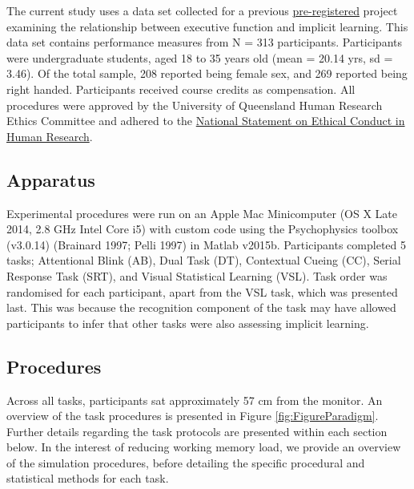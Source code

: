 \documentclass{article}
\begin{document}
\label{sec:Participants}

The current study uses a data set collected for a previous
\href{https://osf.io/nxysg}{pre-registered} project examining the
relationship between executive function and implicit learning. This data
set contains performance measures from N = 313 participants.
Participants were undergraduate students, aged 18 to 35 years old (mean
= 20.14 yrs, sd = 3.46). Of the total sample, 208 reported being female
sex, and 269 reported being right handed. Participants received course
credits as compensation. All procedures were approved by the University
of Queensland Human Research Ethics Committee and adhered to the
\href{https://www.nhmrc.gov.au/about-us/publications/national-statement-ethical-conduct-human-research-2007-updated-2018}{National
Statement on Ethical Conduct in Human Research}.

\hypertarget{apparatus}{%
\subsection{Apparatus}\label{apparatus}}

\label{sec:Apparatus}

Experimental procedures were run on an Apple Mac Minicomputer (OS X Late
2014, 2.8 GHz Intel Core i5) with custom code using the Psychophysics
toolbox (v3.0.14) (Brainard 1997; Pelli 1997) in Matlab v2015b.
Participants completed 5 tasks; Attentional Blink (AB), Dual Task (DT),
Contextual Cueing (CC), Serial Response Task (SRT), and Visual
Statistical Learning (VSL). Task order was randomised for each
participant, apart from the VSL task, which was presented last. This was
because the recognition component of the task may have allowed
participants to infer that other tasks were also assessing implicit
learning.

\hypertarget{procedures}{%
\subsection{Procedures}\label{procedures}}

\label{sec:Procedures}

Across all tasks, participants sat approximately 57 cm from the monitor.
An overview of the task procedures is presented in Figure
\ref{fig:FigureParadigm}. Further details regarding the task protocols
are presented within each section below. In the interest of reducing
working memory load, we provide an overview of the simulation
procedures, before detailing the specific procedural and statistical
methods for each task.
\end{document}
